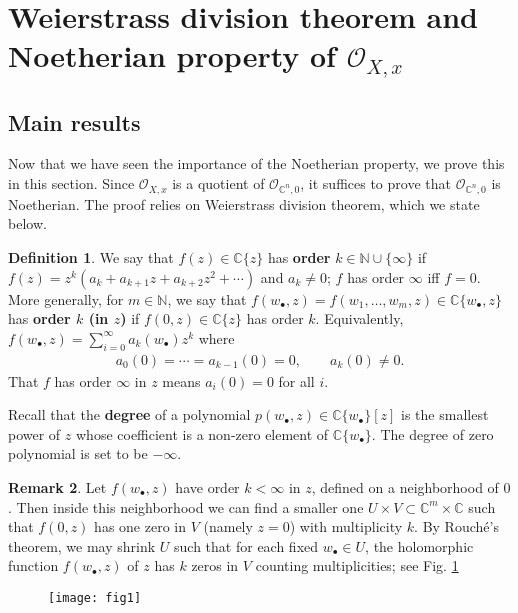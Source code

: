 \documentclass[12pt,b5paper,notitlepage]{report}
\theoremstyle{definition}
\newtheorem{df}{Definition}[section]
\newtheorem{rem}[df]{Remark}
\theoremstyle{plain}
\newcommand{\scr}{\mathscr}
\newcommand{\blt}{\bullet}
\newcommand{\Cbb}{\mathbb C}
\newcommand{\Nbb}{\mathbb N}
\numberwithin{equation}{section}
\begin{document}
\section{Weierstrass division theorem and Noetherian property of $\scr O_{X,x}$}


\subsection{Main results}

Now that we have seen the importance of the Noetherian property, we prove this in this section. Since $\scr O_{X,x}$ is a quotient of $\scr O_{\Cbb^n,0}$, it suffices to prove that $\scr O_{\Cbb^n,0}$ is Noetherian. The proof relies on Weierstrass division theorem, which we state below.

\begin{df}
We say that $f(z)\in\Cbb\{z\}$ has \textbf{order} $k\in\Nbb\cup\{\infty\}$ if $f(z)=z^k(a_k+a_{k+1}z+a_{k+2}z^2+\cdots)$ and $a_k\neq0$; $f$ has order $\infty$ iff $f=0$. More generally, for $m\in\Nbb$, we say that $f(w_\blt,z)=f(w_1,\dots,w_m,z)\in\Cbb\{w_\blt,z\}$ has \textbf{order $k$ (in $z$)}  if $f(0,z)\in\Cbb\{z\}$ has order $k$. \index{00@Orders of elements of $\Cbb\{w_\blt,z\}$} Equivalently, $f(w_\blt,z)=\sum_{i=0}^\infty a_k(w_\blt)z^k$ where
\begin{align}
a_0(0)=\cdots=a_{k-1}(0)=0,\qquad a_k(0)\neq 0.
\end{align}
That $f$ has order $\infty$ in $z$ means $a_i(0)=0$ for all $i$. 

Recall that the \textbf{degree} of a polynomial $p(w_\blt,z)\in \Cbb\{w_\blt\}[z]$ is the smallest power of $z$ whose coefficient is a non-zero element of $\Cbb\{w_\blt\}$. The degree of zero polynomial is set to be $-\infty$. \hfill\qedsymbol
\end{df}

\begin{rem}\label{lb16}
Let $f(w_\blt,z)$ have order $k<\infty$ in $z$, defined on a neighborhood of $0$. Then inside this neighborhood we can find a smaller one  $U\times V\subset\Cbb^m\times\Cbb$ such that $f(0,z)$ has one zero in $V$ (namely $z=0$) with multiplicity $k$. By Rouch\'e's theorem, we may shrink $U$ such that for each fixed $w_\blt\in U$, the holomorphic function $f(w_\blt,z)$ of $z$ has $k$ zeros in $V$ counting multiplicities; see Fig. \ref{fig1}
\begin{figure}[h]
	\centering
	\texttt{[image: fig1]}
	\caption{}
	\label{fig1}
\end{figure}
\end{rem}
\end{document}
